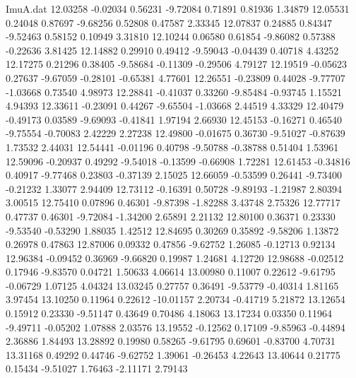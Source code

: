 \begin{filecontents}{ImuA.dat}
  12.03258   -0.02034    0.56231   -9.72084    0.71891    0.81936    1.34879
  12.05531    0.24048    0.87697   -9.68256    0.52808    0.47587    2.33345
  12.07837    0.24885    0.84347   -9.52463    0.58152    0.10949    3.31810
  12.10244    0.06580    0.61854   -9.86082    0.57388   -0.22636    3.81425
  12.14882    0.29910    0.49412   -9.59043   -0.04439    0.40718    4.43252
  12.17275    0.21296    0.38405   -9.58684   -0.11309   -0.29506    4.79127
  12.19519   -0.05623    0.27637   -9.67059   -0.28101   -0.65381    4.77601
  12.26551   -0.23809    0.44028   -9.77707   -1.03668    0.73540    4.98973
  12.28841   -0.41037    0.33260   -9.85484   -0.93745    1.15521    4.94393
  12.33611   -0.23091    0.44267   -9.65504   -1.03668    2.44519    4.33329
  12.40479   -0.49173    0.03589   -9.69093   -0.41841    1.97194    2.66930
  12.45153   -0.16271    0.46540   -9.75554   -0.70083    2.42229    2.27238
  12.49800   -0.01675    0.36730   -9.51027   -0.87639    1.73532    2.44031
  12.54441   -0.01196    0.40798   -9.50788   -0.38788    0.51404    1.53961
  12.59096   -0.20937    0.49292   -9.54018   -0.13599   -0.66908    1.72281
  12.61453   -0.34816    0.40917   -9.77468    0.23803   -0.37139    2.15025
  12.66059   -0.53599    0.26441   -9.73400   -0.21232    1.33077    2.94409
  12.73112   -0.16391    0.50728   -9.89193   -1.21987    2.80394    3.00515
  12.75410    0.07896    0.46301   -9.87398   -1.82288    3.43748    2.75326
  12.77717    0.47737    0.46301   -9.72084   -1.34200    2.65891    2.21132
  12.80100    0.36371    0.23330   -9.53540   -0.53290    1.88035    1.42512
  12.84695    0.30269    0.35892   -9.58206    1.13872    0.26978    0.47863
  12.87006    0.09332    0.47856   -9.62752    1.26085   -0.12713    0.92134
  12.96384   -0.09452    0.36969   -9.66820    0.19987    1.24681    4.12720
  12.98688   -0.02512    0.17946   -9.83570    0.04721    1.50633    4.06614
  13.00980    0.11007    0.22612   -9.61795   -0.06729    1.07125    4.04324
  13.03245    0.27757    0.36491   -9.53779   -0.40314    1.81165    3.97454
  13.10250    0.11964    0.22612  -10.01157    2.20734   -0.41719    5.21872
  13.12654    0.15912    0.23330   -9.51147    0.43649    0.70486    4.18063
  13.17234    0.03350    0.11964   -9.49711   -0.05202    1.07888    2.03576
  13.19552   -0.12562    0.17109   -9.85963   -0.44894    2.36886    1.84493
  13.28892    0.19980    0.58265   -9.61795    0.69601   -0.83700    4.70731
  13.31168    0.49292    0.44746   -9.62752    1.39061   -0.26453    4.22643
  13.40644    0.21775    0.15434   -9.51027    1.76463   -2.11171    2.79143

\end{filecontents}
